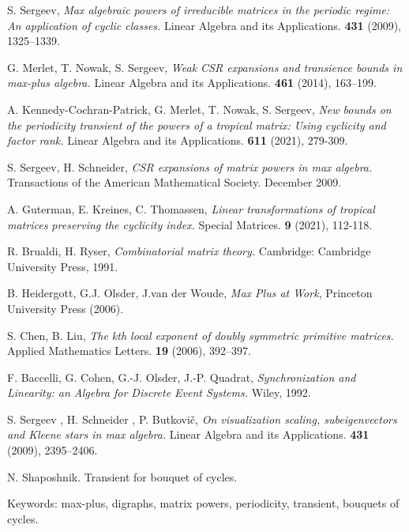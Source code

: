 \documentclass[12pt]{article}
\theoremstyle{definition}
\begin{document}
\begin{thebibliography}{9}

S. Sergeev, \textit{Max algebraic powers of irreducible matrices in the periodic regime: An application of cyclic classes.} Linear Algebra and its Applications. \textbf{431} (2009), 1325–1339.

G. Merlet, T. Nowak, S. Sergeev, \textit{Weak CSR expansions and transience bounds in max-plus algebra.}
Linear Algebra and its Applications. \textbf{461} (2014), 163–199.

A. Kennedy-Cochran-Patrick, G. Merlet, T. Nowak, S. Sergeev,
\textit{New bounds on the periodicity transient of the powers of a tropical matrix: Using cyclicity and factor rank.}
Linear Algebra and its Applications. \textbf{611} (2021), 279-309.

S. Sergeev, H. Schneider,
\textit{CSR expansions of matrix powers in max algebra.} Transactions of the American Mathematical Society. December 2009.

A. Guterman, E. Kreines, C. Thomassen,
\textit{Linear transformations of tropical matrices
preserving the cyclicity index.}
Special Matrices. \textbf{9} (2021), 112-118.

R. Brualdi, H. Ryser, \textit{Combinatorial matrix theory.} Cambridge: Cambridge University Press, 1991.

B. Heidergott, G.J. Olsder, J.van der Woude, \textit{Max Plus at Work}, Princeton University Press (2006).

S. Chen, B. Liu, \textit{The kth local exponent of doubly symmetric primitive matrices.} Applied Mathematics Letters. \textbf{19} (2006), 392–397.

F. Baccelli, G. Cohen, G.-J. Olsder, J.-P. Quadrat, \textit{Synchronization and Linearity: an Algebra for Discrete Event Systems.} Wiley, 1992.

S. Sergeev , H. Schneider , P. Butkovič, \textit{On visualization scaling, subeigenvectors and Kleene stars in max algebra.}
Linear Algebra and its Applications. \textbf{431} (2009), 2395–2406.

\end{thebibliography}

N. Shaposhnik. Transient for bouquet of cycles.

Keywords: max-plus, digraphs, matrix powers, periodicity, transient, bouquets of cycles.
\end{document}
